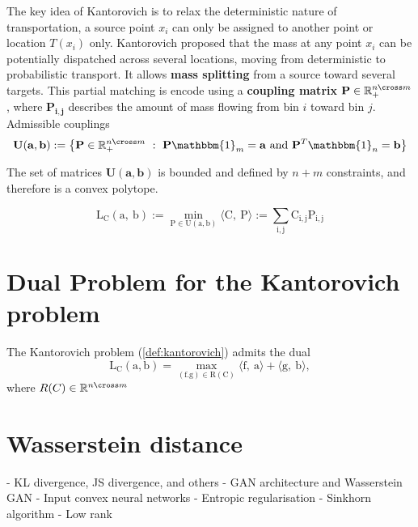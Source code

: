 The key idea of Kantorovich is to relax the deterministic nature of transportation, a source point $x_i$ can only be assigned to another point or location $T(x_i)$ only. Kantorovich proposed that the mass at any point $x_i$ can be potentially dispatched across several locations, moving from deterministic to probabilistic transport. It allows \textbf{mass splitting} from a source toward several targets. This partial matching is encode using a \textbf{coupling matrix} $\mathbf{P}\in\mathbb{R}_+^{n\cross m}$, where $\mathbf{P_{i,j}}$ describes the amount of mass flowing from bin $i$ toward bin $j$. Admissible couplings
$$
\mathbf{U}(\mathbf{a},\mathbf{b}):=\bigl\{ \mathbf{P}\in\mathbb{R}_+^{n\cross m}\ :\ \mathbf{P}\mathbbm{1}_m=\mathbf{a} \text{ and }\mathbf{P}^T\mathbbm{1}_n=\mathbf{b} \bigr\}
$$

The set of matrices $\mathbf{U}(\mathbf{a},\mathbf{b})$ is bounded and defined by $n+m$ constraints, and therefore is a convex polytope.


\begin{definition}\label{def:kantorovich}
$$
\mathrm{L_C(a,\ b):=\min_{P\in U(a,b)}\langle C,\ P \rangle := \sum_{i,j}C_{i,j}P_{i,j}}
$$
\end{definition}

\section{Dual Problem for the Kantorovich problem}

\begin{proposition}\label{prop}
  The Kantorovich problem (\autoref{def:kantorovich}) admits the dual
  \[
    \mathrm{L_C(a,b)=\max_{(f.g)\in R(C)}\langle f,\ a\rangle+\langle g,\ b\rangle}, 
  \]
  where $R(C)\in \mathbb{R}^{n\cross m}$
\end{proposition}

\section{Wasserstein distance}

\begin{definition}\label{def}
    
\end{definition}

- KL divergence, JS divergence, and others
- GAN architecture  and Wasserstein GAN
- Input convex neural networks
- Entropic regularisation
- Sinkhorn algorithm
- Low rank



